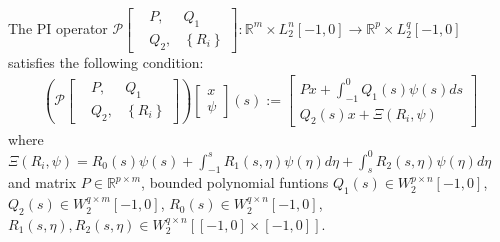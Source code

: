 \documentclass[twocolumn]{autart}    %
\begin{document}
\begin{defn}%
    The PI operator $\mathcal{P}\begin{bmatrix}
        &P,&Q_{1}\\
        &Q_{2},&\left\{R_{i}\right\}
    \end{bmatrix} : \mathbb{R}^{m}\times L_{2}^{n}\left[-1,0\right] \rightarrow \mathbb{R}^{p}\times L_{2}^{q}\left[-1,0\right]$
    satisfies the following condition:
    \begin{equation} \label{e1}
        \begin{aligned}
            \left(\mathcal{P}\begin{bmatrix}
                &P,&Q_{1}\\
                &Q_{2},&\left\{R_{i}\right\}
            \end{bmatrix}\right)\begin{bmatrix}
                x\\
                \psi
            \end{bmatrix}(s):=\begin{bmatrix}
                Px+\int_{-1}^{0}Q_{1}(s)\psi(s)ds\\
                Q_{2}(s)x+\Xi(R_{i},\psi)
            \end{bmatrix}
        \end{aligned}
    \end{equation}
where $\Xi(R_{i},\psi) = R_{0}(s)\psi(s)+\int_{-1}^{s}R_{1}(s,\eta)\psi(\eta)d\eta+\int_{s}^{0}R_{2}(s,\eta)\psi(\eta)d\eta$ 
and matrix $P \in \mathbb{R}^{p \times m}$, bounded polynomial funtions $Q_{1}(s) \in W_{2}^{p \times n}\left[-1,0\right]$,$Q_{2}(s) \in W_{2}^{q \times m}\left[-1,0\right]$, 
$R_{0}(s) \in W_{2}^{q \times n}\left[-1,0\right]$, $R_{1}(s,\eta),R_{2}(s,\eta) \in W_{2}^{q \times n}\left[\left[-1,0\right]\times\left[-1,0\right]\right]$. 
\end{defn}
\end{document}
